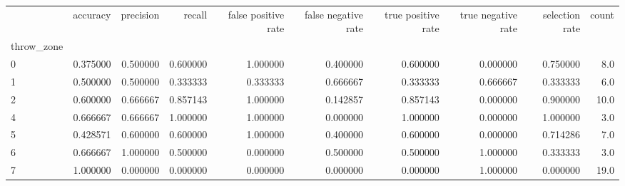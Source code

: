 \begin{tabular}{lrrrrrrrrr}
\toprule
{} &  accuracy &  precision &    recall &  false positive rate &  false negative rate &  true positive rate &  true negative rate &  selection rate &  count \\
throw\_zone &           &            &           &                      &                      &                     &                     &                 &        \\
\midrule
0          &  0.375000 &   0.500000 &  0.600000 &             1.000000 &             0.400000 &            0.600000 &            0.000000 &        0.750000 &    8.0 \\
1          &  0.500000 &   0.500000 &  0.333333 &             0.333333 &             0.666667 &            0.333333 &            0.666667 &        0.333333 &    6.0 \\
2          &  0.600000 &   0.666667 &  0.857143 &             1.000000 &             0.142857 &            0.857143 &            0.000000 &        0.900000 &   10.0 \\
4          &  0.666667 &   0.666667 &  1.000000 &             1.000000 &             0.000000 &            1.000000 &            0.000000 &        1.000000 &    3.0 \\
5          &  0.428571 &   0.600000 &  0.600000 &             1.000000 &             0.400000 &            0.600000 &            0.000000 &        0.714286 &    7.0 \\
6          &  0.666667 &   1.000000 &  0.500000 &             0.000000 &             0.500000 &            0.500000 &            1.000000 &        0.333333 &    3.0 \\
7          &  1.000000 &   0.000000 &  0.000000 &             0.000000 &             0.000000 &            0.000000 &            1.000000 &        0.000000 &   19.0 \\
\bottomrule
\end{tabular}
